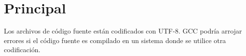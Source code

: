 \section{Principal}

Los archivos de código fuente están codificados con UTF-8. GCC podría arrojar
errores si el código fuente es compilado en un sistema donde se utilice otra
codificación.




